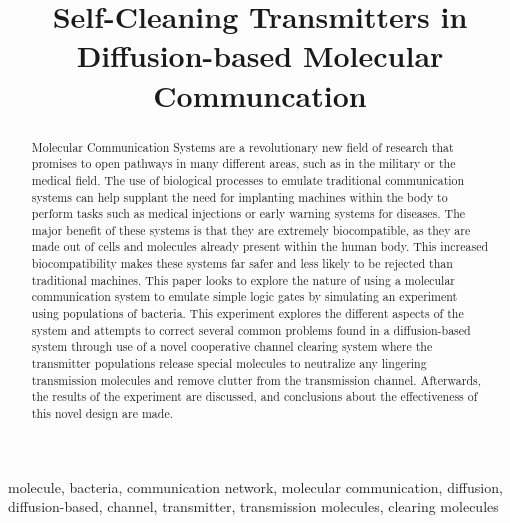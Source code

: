 \documentclass[conference]{IEEEtran}
\begin{document}
\title{Self-Cleaning Transmitters in Diffusion-based Molecular Communcation\\
}

\author{
\and
{}
}

\maketitle

\begin{abstract}
Molecular Communication Systems are a revolutionary new field of research that promises to open pathways in many different areas, such as in the military or the medical field. The use of biological processes to emulate traditional communication systems can help supplant the need for implanting machines within the body to perform tasks such as medical injections or early warning systems for diseases. The major benefit of these systems is that they are extremely biocompatible, as they are made out of cells and molecules already present within the human body. This increased biocompatibility makes these systems far safer and less likely to be rejected than traditional machines. This paper looks to explore the nature of using a molecular communication system to emulate simple logic gates by simulating an experiment using populations of bacteria. This experiment explores the different aspects of the system and attempts to correct several common problems found in a diffusion-based system through use of a novel cooperative channel clearing system where the transmitter populations release special molecules to neutralize any lingering transmission molecules and remove clutter from the transmission channel. Afterwards, the results of the experiment are discussed, and conclusions about the effectiveness of this novel design are made.
\end{abstract}

\begin{IEEEkeywords}
molecule, bacteria, communication network, molecular communication, diffusion, diffusion-based, channel, transmitter, transmission molecules, clearing molecules
\end{IEEEkeywords}
\end{document}
